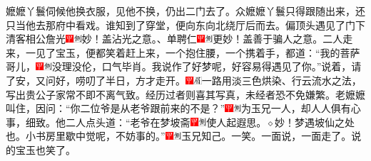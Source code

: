 嬷嬷丫鬟伺候他换衣服，见他不换，仍出二门去了。众嬷嬷丫鬟只得跟随出来，还只当他去那府中看戏。谁知到了穿堂，便向东向北绕厅后而去。偏顶头遇见了门下清客相公詹光{\includegraphics[width=3mm]{../Images/00002}\includegraphics[width=3mm]{../Images/00011}\footnotesize \kaishu 妙！盖沾光之意。}、单聘仁{\includegraphics[width=3mm]{../Images/00002}\includegraphics[width=3mm]{../Images/00011}\footnotesize \kaishu 更妙！盖善于骗人之意。}二人走来，一见了宝玉，便都笑着赶上来，一个抱住腰，一个携着手，都道：“我的菩萨哥儿，{\includegraphics[width=3mm]{../Images/00002}\includegraphics[width=3mm]{../Images/00011}\footnotesize \kaishu 没理没伦，口气毕肖。}我说作了好梦呢，好容易得遇见了你。”说着，请了安，又问好，唠叨了半日，方才走开。{\includegraphics[width=3mm]{../Images/00002}\includegraphics[width=3mm]{../Images/00010}\footnotesize \kaishu 一路用淡三色烘染、行云流水之法，写出贵公子家常不即不离气致。经历过者则喜其写真，未经者恐不免嫌繁。}老嬷嬷叫住，因问：“你二位爷是从老爷跟前来的不是？”{\includegraphics[width=3mm]{../Images/00002}\includegraphics[width=3mm]{../Images/00011}\footnotesize \kaishu 为玉兄一人，却人人俱有心事，细致。}他二人点头道：“老爷在梦坡斋{\includegraphics[width=3mm]{../Images/00002}\includegraphics[width=3mm]{../Images/00011}\footnotesize \kaishu 使人起遐思。{$\diamond$}妙！梦遇坡仙之处也。}小书房里歇中觉呢，不妨事的。”{\includegraphics[width=3mm]{../Images/00002}\includegraphics[width=3mm]{../Images/00011}\footnotesize \kaishu 玉兄知己。一笑。}一面说，一面走了。说的宝玉也笑了。

